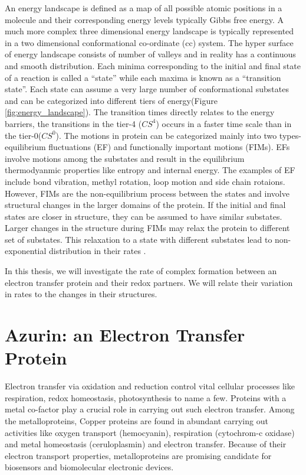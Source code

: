 \documentclass[11pt,a4paper,onecolumn]{article}
\begin{document}
An energy landscape is defined as a map of all possible atomic positions in a molecule and their corresponding energy levels typically Gibbs free energy.
A much more complex three dimensional energy landscape is typically represented in a two dimensional conformational co-ordinate (cc) system.
The hyper surface of energy landscape consists of number of valleys and in reality has a continuous and smooth distribution.
Each minima corresponding to the initial and final state of a reaction is called a ``state'' while each maxima is known as a ``transition state''.
Each state can assume a very large number of conformational substates and can be categorized into different tiers of energy(Figure \ref{fig:energy_landscape}).
The transition times directly relates to the energy barriers, the transitions in the tier-4 ($CS^4$) occurs in a faster time scale than in the tier-0($CS^0$).
The motions in protein can be categorized mainly into two types- equilibrium fluctuations (EF) and  functionally important motions (FIMs).\cite{ansari1985protein}
EFs involve motions among the substates and result in the equilibrium thermodyanmic properties like entropy and internal energy. 
The examples of EF include bond vibration, methyl rotation, loop motion and side chain rotaions.
However, FIMs are the non-equilibrium process between the states and involve structural changes in the larger domains of the protein.
If the initial and final states are closer in structure, they can be assumed to have similar substates. 
Larger changes in the structure during FIMs may relax the protein to different set of substates. This relaxation to a state with different substates lead to non-exponential distribution in their rates .

In this thesis, we will investigate the rate of complex formation between an electron transfer protein and their redox partners. We will relate their variation in rates to the changes in their structures.

\section{Azurin: an Electron Transfer Protein}
Electron transfer via oxidation and reduction control vital cellular processes like respiration, redox homeostasis, photosynthesis to name a few.
Proteins with a metal co-factor play a crucial role in carrying out such electron transfer.
Among the metalloproteins, Copper proteins are found in abundant carrying out activities like oxygen transport (hemocyanin), respiration (cytochrom-c oxidase) and metal homeostasis (ceruloplasmin) and electron transfer.
Because of their electron transport properties, metalloproteins are promising candidate for biosensors and biomolecular electronic devices.
\end{document}
